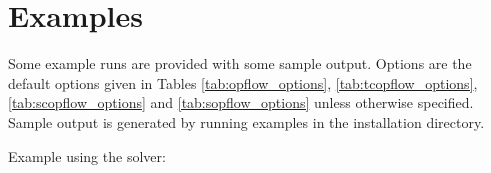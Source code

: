 
\section{Examples}
Some \sopflow example runs are provided with some sample output. Options are the default options given in Tables \ref{tab:opflow_options}, \ref{tab:tcopflow_options}, \ref{tab:scopflow_options} and \ref{tab:sopflow_options} unless otherwise specified. Sample output is generated by running examples in the installation directory.

Example using the \ipopt solver:


